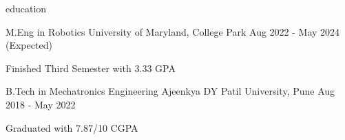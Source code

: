 \begin{section}{education}

  \begin{school}
    {M.Eng in Robotics}
    {University of Maryland, College Park}
    {Aug 2022 - May 2024 (Expected)}

    \item Finished Third Semester with 3.33 GPA

  \end{school}

  \begin{school}
    {B.Tech in Mechatronics Engineering}
    {Ajeenkya DY Patil University, Pune}
    {Aug 2018 - May 2022}

    \item Graduated with 7.87/10 CGPA

  \end{school}

\end{section}